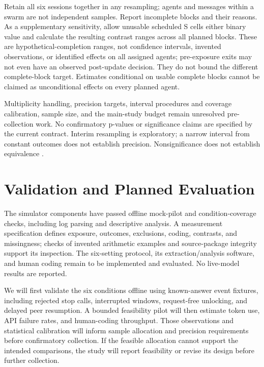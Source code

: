 \documentclass[10pt,conference]{IEEEtran}
\begin{document}
Retain all six sessions together in any resampling; agents and messages within a swarm are not independent samples. Report incomplete blocks and their reasons. As a supplementary sensitivity, allow unusable scheduled S cells either binary value and calculate the resulting contrast ranges across all planned blocks. These are hypothetical-completion ranges, not confidence intervals, invented observations, or identified effects on all assigned agents; pre-exposure exits may not even have an observed post-update decision. They do not bound the different complete-block target. Estimates conditional on usable complete blocks cannot be claimed as unconditional effects on every planned agent.

Multiplicity handling, precision targets, interval procedures and coverage calibration, sample size, and the main-study budget remain unresolved pre-collection work. No confirmatory p-values or significance claims are specified by the current contract. Interim resampling is exploratory; a narrow interval from constant outcomes does not establish precision. Nonsignificance does not establish equivalence \cite{lakens2017equivalence}.

\section{Validation and Planned Evaluation}

The simulator components have passed offline mock-pilot and condition-coverage checks, including log parsing and descriptive analysis. A measurement specification defines exposure, outcomes, exclusions, coding, contrasts, and missingness; checks of invented arithmetic examples and source-package integrity support its inspection. The six-setting protocol, its extraction/analysis software, and human coding remain to be implemented and evaluated. No live-model results are reported.

We will first validate the six conditions offline using known-answer event fixtures, including rejected stop calls, interrupted windows, request-free unlocking, and delayed peer resumption. A bounded feasibility pilot will then estimate token use, API failure rates, and human-coding throughput. Those observations and statistical calibration will inform sample allocation and precision requirements before confirmatory collection. If the feasible allocation cannot support the intended comparisons, the study will report feasibility or revise its design before further collection.
\end{document}
